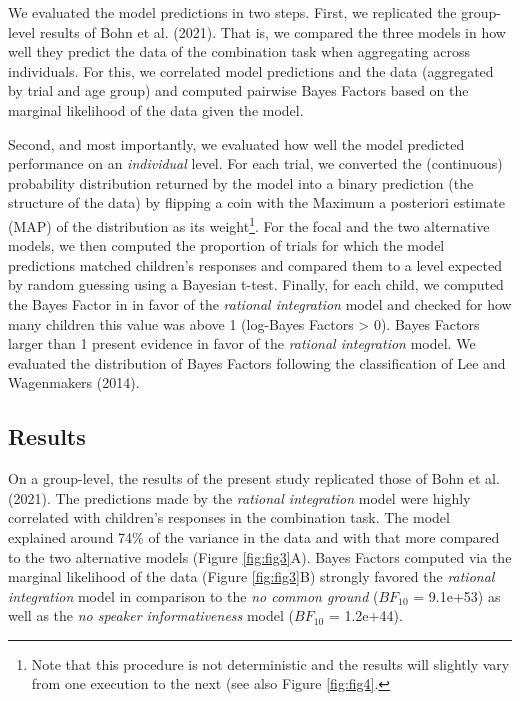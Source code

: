 \documentclass[
  man,floatsintext]{apa6}
\begin{document}
We evaluated the model predictions in two steps. First, we replicated the group-level results of Bohn et al. (2021). That is, we compared the three models in how well they predict the data of the combination task when aggregating across individuals. For this, we correlated model predictions and the data (aggregated by trial and age group) and computed pairwise Bayes Factors based on the marginal likelihood of the data given the model.

Second, and most importantly, we evaluated how well the model predicted performance on an \emph{individual} level. For each trial, we converted the (continuous) probability distribution returned by the model into a binary prediction (the structure of the data) by flipping a coin with the Maximum a posteriori estimate (MAP) of the distribution as its weight\footnote{Note that this procedure is not deterministic and the results will slightly vary from one execution to the next (see also Figure \ref{fig:fig4}.}. For the focal and the two alternative models, we then computed the proportion of trials for which the model predictions matched children's responses and compared them to a level expected by random guessing using a Bayesian t-test. Finally, for each child, we computed the Bayes Factor in in favor of the \emph{rational integration} model and checked for how many children this value was above 1 (log-Bayes Factors \textgreater{} 0). Bayes Factors larger than 1 present evidence in favor of the \emph{rational integration} model. We evaluated the distribution of Bayes Factors following the classification of Lee and Wagenmakers (2014).

\hypertarget{results-1}{%
\subsection{Results}\label{results-1}}

On a group-level, the results of the present study replicated those of Bohn et al. (2021). The predictions made by the \emph{rational integration} model were highly correlated with children's responses in the combination task. The model explained around 74\% of the variance in the data and with that more compared to the two alternative models (Figure \ref{fig:fig3}A). Bayes Factors computed via the marginal likelihood of the data (Figure \ref{fig:fig3}B) strongly favored the \emph{rational integration} model in comparison to the \emph{no common ground} (\(BF_{10}\) = 9.1e+53) as well as the \emph{no speaker informativeness} model (\(BF_{10}\) = 1.2e+44).
\end{document}

